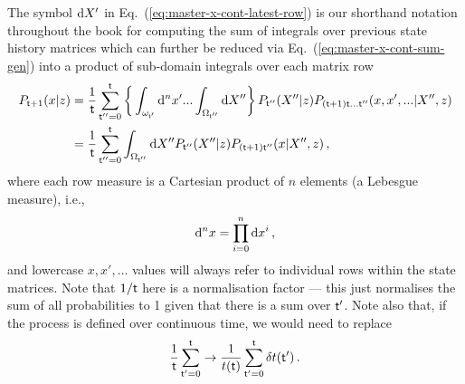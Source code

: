 The symbol ${\rm d}X'$ in Eq.~(\ref{eq:master-x-cont-latest-row}) is our shorthand notation throughout the book for computing the sum of integrals over previous state history matrices which can further be reduced via Eq.~(\ref{eq:master-x-cont-sum-gen}) into a product of sub-domain integrals over each matrix row
\begin{align}
P_{{\sf t}+1}(x\vert z) &= \frac{1}{{\sf t}}\sum_{{\sf t}''=0}^{{\sf t}} \bigg\lbrace \int_{\omega_{{\sf t}'}}{\rm d}^nx'...\int_{\Omega_{{\sf t}''}}{\rm d}X'' \bigg\rbrace \,P_{{\sf t}''}(X''\vert z) P_{({\sf t}+1){\sf t}\dots{\sf t}''}(x,x',... \vert X'',z) \\
&= \frac{1}{{\sf t}}\sum_{{\sf t}''=0}^{{\sf t}} \int_{\Omega_{{\sf t}''}}{\rm d}X'' P_{{\sf t}''}(X''\vert z) P_{({\sf t}+1){\sf t}''}(x \vert X'',z) \label{eq:master-x-cont-latest-row-gen} \,,
\end{align}
where each row measure is a Cartesian product of $n$ elements (a Lebesgue measure), i.e.,
\begin{align}
{\rm d}^nx = \prod_{i=0}^n{\rm d}x^i \,,
\end{align}
and lowercase $x, x', \dots$ values will always refer to individual rows within the state matrices. Note that $1/{\sf t}$ here is a normalisation factor --- this just normalises the sum of all probabilities to 1 given that there is a sum over ${\sf t}'$. Note also that, if the process is defined over continuous time, we would need to replace 
\begin{align}
\frac{1}{{\sf t}}\sum_{{\sf t}'=0}^{{\sf t}} \rightarrow \frac{1}{t({\sf t})}\sum_{{\sf t}'=0}^{{\sf t}}\delta t({\sf t}') \,.
\end{align}

